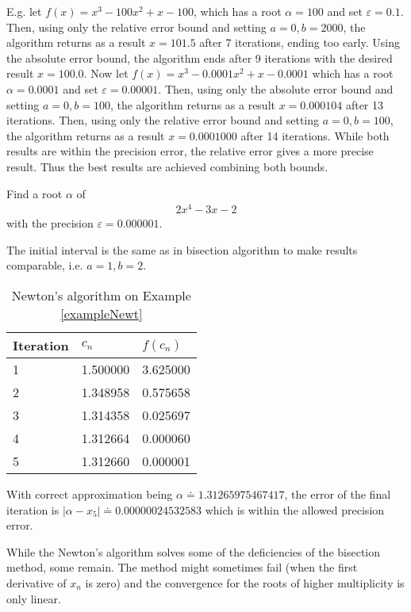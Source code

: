 \documentclass[
  digital, %
  table,   %
  nolof,     %
  nolot,     %
	draft, %
]{fithesis3}
\begin{document}
E.g. let $f(x)=x^3-100x^2+x-100$, which has a root $\alpha=100$ and set $\varepsilon=0.1$. Then, using only the relative error bound and setting $a=0, b=2000$, the algorithm returns as a result $x=101.5$ after 7 iterations, ending too early. Using the absolute error bound, the algorithm ends after 9 iterations with the desired result $x=100.0$. 
Now let $f(x)=x^3-0.0001x^2+x-0.0001$ which has a root $\alpha=0.0001$ and set $\varepsilon=0.00001$. Then, using only the absolute error bound and setting $a=0, b=100$, the algorithm returns as a result $x=0.000104$ after 13 iterations. Then, using only the relative error bound and setting $a=0, b=100$, the algorithm returns as a result $x=0.0001000$ after 14 iterations. While both results are within the precision error, the relative error gives a more precise result. Thus the best results are achieved combining both bounds.
\begin{example}
\label{exampleNewt}
Find a root $\alpha$ of 
\begin{align}
      2x^{4} - 3x - 2
\end{align}
with the precision $\varepsilon = 0.000001$.
\end{example}
The initial interval is the same as in bisection algorithm to make results comparable, i.e. $a=1, b=2$.
\FloatBarrier
\begin{table}[H]
  \begin{tabularx}{\textwidth}{lll}
    \toprule
    Iteration & $c_{n}$ & $f(c_{n})$\\
    \midrule
			1 & 1.500000 & 3.625000 \\
			2 & 1.348958 & 0.575658 \\
			3 & 1.314358 & 0.025697 \\
			4 & 1.312664 & 0.000060 \\
			5 & 1.312660 & 0.000001 \\
    \bottomrule
  \end{tabularx}
  \caption{Newton's algorithm on Example \ref{exampleNewt}}
  \label{tab:newt}
\end{table}

With correct approximation being $\alpha \doteq 1.31265975467417$, the error of the final iteration is $|\alpha - x_{5}|\doteq0.00000024532583$ which is within the allowed precision error.

While the Newton's algorithm solves some of the deficiencies of the bisection method, some remain. The method might sometimes fail (when the first derivative of $x_{n}$ is zero) and the convergence for the roots of higher multiplicity is only linear.
\end{document}
